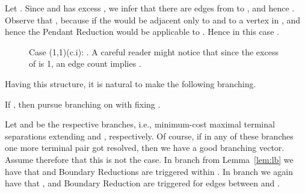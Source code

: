 Let . Since  and  has excess , we infer that there are  edges from  to , and hence . Observe that , because if  the  would be adjacent only to  and to a vertex in , and hence the Pendant Reduction would be applicable to . Hence in this case .


\begin{figure}[H]
	\centering
	\clearpage{}
\figspace
\clearpage{}
	\caption{Case (1,1)(c.i): . A careful reader might notice that since the excess of  is 1, an edge count implies .}
\label{fig:case-11-ci}
\end{figure}

Having this structure, it is natural to make the following branching.

\begin{branching}
If , then pursue branching on  with fixing .
\end{branching}

Let  and  be the respective branches, i.e., minimum-cost maximal terminal separations extending  and , respectively. Of course, if in any of these branches one more terminal pair got resolved, then we have a good branching vector. Assume therefore that this is not the case. In branch  from Lemma~\ref{lem:lb} we have that  and  Boundary Reductions are triggered within . In branch  we again have that , and  Boundary Reduction are triggered for edges between  and .

